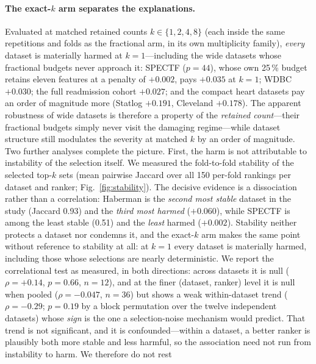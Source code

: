 \documentclass[fleqn,10pt]{wlscirep}
\newcommand{\result}[1]{#1}
\begin{document}
\paragraph{The exact-$k$ arm separates the explanations.} Evaluated at matched retained counts
$k\in\{1,2,4,8\}$ (each inside the same repetitions and folds as the fractional arm, in its own
multiplicity family), \emph{every} dataset is materially harmed at $k=1$---including the wide
datasets whose fractional budgets never approach it: SPECTF ($p=44$), whose own 25\,\% budget retains
eleven features at a penalty of \result{$+0.002$}, pays \result{$+0.035$} at $k=1$; WDBC
\result{$+0.030$}; the full readmission cohort \result{$+0.027$}; and the compact heart datasets pay
an order of magnitude more (Statlog \result{$+0.191$}, Cleveland \result{$+0.178$}). The apparent
robustness of wide datasets is therefore a property of the \emph{retained count}---their fractional
budgets simply never visit the damaging regime---while dataset structure still modulates the severity
at matched $k$ by an order of magnitude. Two further analyses complete the picture. First, the harm is
not attributable to instability of the selection itself. We measured the fold-to-fold stability of the
selected top-$k$ sets (mean pairwise Jaccard over all \result{150} per-fold rankings per dataset and
ranker; Fig.~\ref{fig:stability}). The decisive evidence is a dissociation rather than a correlation:
Haberman is the \emph{second most stable} dataset in the study (Jaccard \result{0.93}) and the
\emph{third most harmed} (\result{$+0.060$}), while SPECTF is among the least stable
(\result{0.51}) and the \emph{least} harmed (\result{$+0.002$}). Stability neither protects a dataset
nor condemns it, and the exact-$k$ arm makes the same point without reference to stability at all:
at $k=1$ every dataset is materially harmed, including those whose selections are nearly
deterministic. We report the correlational test as measured, in both directions: across datasets it
is null ($\rho=\result{+0.14}$, $p=\result{0.66}$, $n=12$), and at the finer (dataset, ranker) level
it is null when pooled ($\rho=\result{-0.047}$, $n=36$) but shows a weak within-dataset trend
($\rho=\result{-0.29}$; $p=\result{0.19}$ by a block permutation over the twelve independent
datasets) whose \emph{sign} is the one a selection-noise mechanism would predict. That trend is not
significant, and it is confounded---within a dataset, a better ranker is plausibly both more stable
and less harmful, so the association need not run from instability to harm. We therefore do not rest
\end{document}

